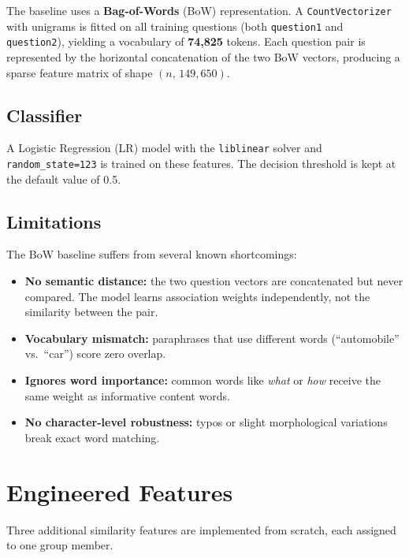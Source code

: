 \documentclass[11pt,a4paper]{article}
\begin{document}
The baseline uses a \textbf{Bag-of-Words} (BoW) representation. A \texttt{CountVectorizer} with unigrams is fitted on all training questions (both \texttt{question1} and \texttt{question2}), yielding a vocabulary of \textbf{74{,}825} tokens. Each question pair is represented by the horizontal concatenation of the two BoW vectors, producing a sparse feature matrix of shape $(n,\,149{,}650)$.

\subsection{Classifier}

A Logistic Regression (LR) model with the \texttt{liblinear} solver and \texttt{random\_state=123} is trained on these features. The decision threshold is kept at the default value of 0.5.

\subsection{Limitations}

The BoW baseline suffers from several known shortcomings:

\begin{itemize}[leftmargin=*]
    \item \textbf{No semantic distance:} the two question vectors are concatenated but never compared. The model learns association weights independently, not the similarity between the pair.
    \item \textbf{Vocabulary mismatch:} paraphrases that use different words (``automobile'' vs.\ ``car'') score zero overlap.
    \item \textbf{Ignores word importance:} common words like \emph{what} or \emph{how} receive the same weight as informative content words.
    \item \textbf{No character-level robustness:} typos or slight morphological variations break exact word matching.
\end{itemize}

\section{Engineered Features}
\label{sec:features}

Three additional similarity features are implemented from scratch, each assigned to one group member.
\end{document}
